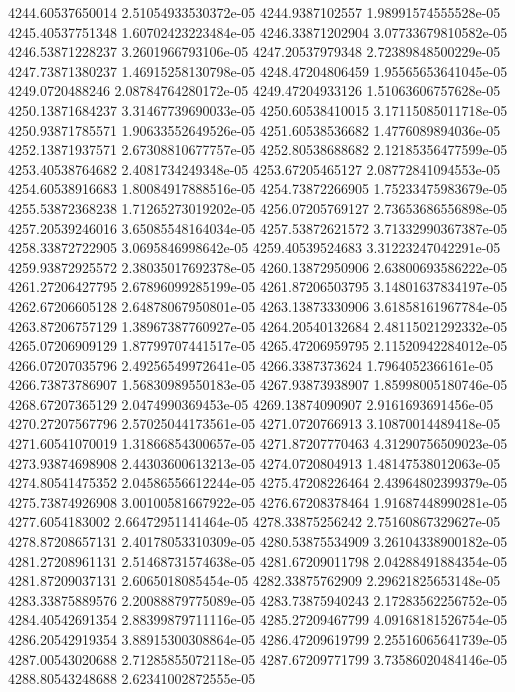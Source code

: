 {4244.60537650014 2.51054933530372e-05
4244.9387102557 1.98991574555528e-05
4245.40537751348 1.60702423223484e-05
4246.33871202904 3.07733679810582e-05
4246.53871228237 3.2601966793106e-05
4247.20537979348 2.72389848500229e-05
4247.73871380237 1.46915258130798e-05
4248.47204806459 1.95565653641045e-05
4249.0720488246 2.08784764280172e-05
4249.47204933126 1.51063606757628e-05
4250.13871684237 3.31467739690033e-05
4250.60538410015 3.17115085011718e-05
4250.93871785571 1.90633552649526e-05
4251.60538536682 1.4776089894036e-05
4252.13871937571 2.67308810677757e-05
4252.80538688682 2.12185356477599e-05
4253.40538764682 2.4081734249348e-05
4253.67205465127 2.08772841094553e-05
4254.60538916683 1.80084917888516e-05
4254.73872266905 1.75233475983679e-05
4255.53872368238 1.71265273019202e-05
4256.07205769127 2.73653686556898e-05
4257.20539246016 3.65085548164034e-05
4257.53872621572 3.71332990367387e-05
4258.33872722905 3.0695846998642e-05
4259.40539524683 3.31223247042291e-05
4259.93872925572 2.38035017692378e-05
4260.13872950906 2.63800693586222e-05
4261.27206427795 2.67896099285199e-05
4261.87206503795 3.14801637834197e-05
4262.67206605128 2.64878067950801e-05
4263.13873330906 3.61858161967784e-05
4263.87206757129 1.38967387760927e-05
4264.20540132684 2.48115021292332e-05
4265.07206909129 1.87799707441517e-05
4265.47206959795 2.11520942284012e-05
4266.07207035796 2.49256549972641e-05
4266.3387373624 1.7964052366161e-05
4266.73873786907 1.56830989550183e-05
4267.93873938907 1.85998005180746e-05
4268.67207365129 2.0474990369453e-05
4269.13874090907 2.9161693691456e-05
4270.27207567796 2.57025044173561e-05
4271.0720766913 3.10870014489418e-05
4271.60541070019 1.31866854300657e-05
4271.87207770463 4.31290756509023e-05
4273.93874698908 2.44303600613213e-05
4274.0720804913 1.48147538012063e-05
4274.80541475352 2.04586556612244e-05
4275.47208226464 2.43964802399379e-05
4275.73874926908 3.00100581667922e-05
4276.67208378464 1.91687448990281e-05
4277.6054183002 2.66472951141464e-05
4278.33875256242 2.75160867329627e-05
4278.87208657131 2.40178053310309e-05
4280.53875534909 3.26104338900182e-05
4281.27208961131 2.51468731574638e-05
4281.67209011798 2.04288491884354e-05
4281.87209037131 2.6065018085454e-05
4282.33875762909 2.29621825653148e-05
4283.33875889576 2.20088879775089e-05
4283.73875940243 2.17283562256752e-05
4284.40542691354 2.88399879711116e-05
4285.27209467799 4.09168181526754e-05
4286.20542919354 3.88915300308864e-05
4286.47209619799 2.25516065641739e-05
4287.00543020688 2.71285855072118e-05
4287.67209771799 3.73586020484146e-05
4288.80543248688 2.62341002872555e-05
}
